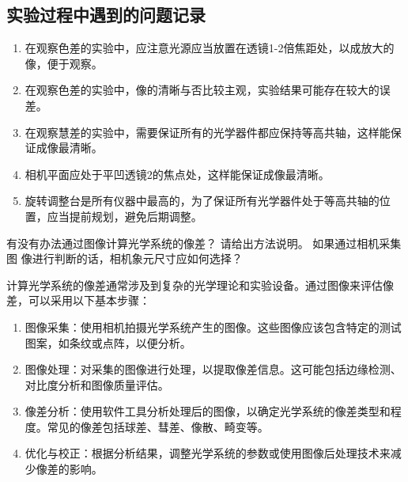 \documentclass[dvipsnames, svgnames,a4paper,11pt]{article}
\begin{document}
	





\clearpage


\newpage

\subsection{实验过程中遇到的问题记录}

	\begin{enumerate}
		\item 在观察色差的实验中，应注意光源应当放置在透镜1-2倍焦距处，以成放大的像，便于观察。
		\item 在观察色差的实验中，像的清晰与否比较主观，实验结果可能存在较大的误差。
		\item 在观察慧差的实验中，需要保证所有的光学器件都应保持等高共轴，这样能保证成像最清晰。
		\item 相机平面应处于平凹透镜2的焦点处，这样能保证成像最清晰。
		\item 旋转调整台是所有仪器中最高的，为了保证所有光学器件处于等高共轴的位置，应当提前规划，避免后期调整。
	\end{enumerate}
\null






\begin{question}
	有没有办法通过图像计算光学系统的像差？ 请给出方法说明。 如果通过相机采集图
像进行判断的话，相机象元尺寸应如何选择？
\end{question}
	
计算光学系统的像差通常涉及到复杂的光学理论和实验设备。通过图像来评估像差，可以采用以下基本步骤：

\begin{enumerate}
	\item 图像采集：使用相机拍摄光学系统产生的图像。这些图像应该包含特定的测试图案，如条纹或点阵，以便分析。
	\item 图像处理：对采集的图像进行处理，以提取像差信息。这可能包括边缘检测、对比度分析和图像质量评估。
	\item 像差分析：使用软件工具分析处理后的图像，以确定光学系统的像差类型和程度。常见的像差包括球差、彗差、像散、畸变等。
	\item 优化与校正：根据分析结果，调整光学系统的参数或使用图像后处理技术来减少像差的影响。
\end{enumerate}
\end{document}
